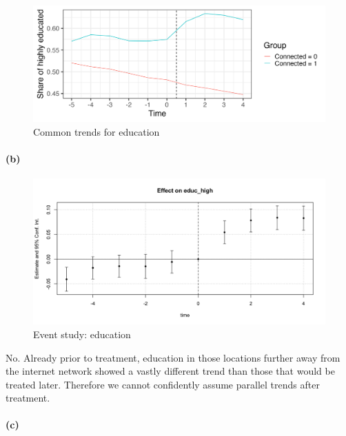 \documentclass{scrartcl}
\begin{document}
\begin{figure}[h!]
    \centering
    \includegraphics[width=0.75\linewidth]{output/figures/2_common_trends.png}
    \caption{Common trends for education}
    \label{fig:commontrends}
\end{figure}

\paragraph*{(b)}

\begin{figure}[h!]
    \centering
    \includegraphics[width=0.75\linewidth]{output/figures/2_event_study.png}
    \caption{Event study: education}
    \label{fig:eventstudy}
\end{figure}


No. Already prior to treatment, education in those locations further away from the internet network showed a vastly different trend than those that would be treated later. Therefore we cannot confidently assume parallel trends after treatment. 

\paragraph*{(c)}

\end{document}
